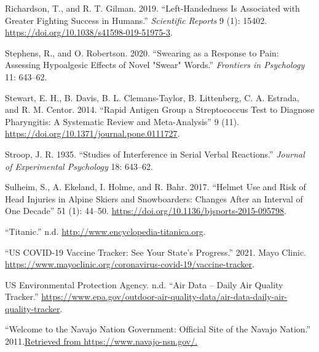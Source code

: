 \documentclass[
]{report}
\newlength{\cslhangindent}
\newlength{\cslentryspacingunit} %
\newenvironment{CSLReferences}[2] %
 {%
  \setlength{\parindent}{0pt}
  \ifodd #1
  \let\oldpar\par
  \def\par{\hangindent=\cslhangindent\oldpar}
  \fi
  \setlength{\parskip}{#2\cslentryspacingunit}
 }%
 {}
\begin{document}
\begin{CSLReferences}{1}{0}
\leavevmode{}%
Richardson, T., and R. T. Gilman. 2019. {``Left-Handedness Is Associated with Greater Fighting Success in Humans.''} \emph{Scientific Reports} 9 (1): 15402. \url{https://doi.org/10.1038/s41598-019-51975-3}.

\leavevmode{}%
Stephens, R., and O. Robertson. 2020. {``Swearing as a Response to Pain: Assessing Hypoalgesic Effects of Novel "Swear" Words.''} \emph{Frontiers in Psychology} 11: 643--62.

\leavevmode{}%
Stewart, E. H., B. Davis, B. L. Clemans-Taylor, B. Littenberg, C. A. Estrada, and R. M. Centor. 2014. {``Rapid Antigen Group a Streptococcus Test to Diagnose Pharyngitis: A Systematic Review and Meta-Analysis''} 9 (11). \url{https://doi.org/10.1371/journal.pone.0111727}.

\leavevmode{}%
Stroop, J. R. 1935. {``Studies of Interference in Serial Verbal Reactions.''} \emph{Journal of Experimental Psychology} 18: 643--62.

\leavevmode{}%
Sulheim, S., A. Ekeland, I. Holme, and R. Bahr. 2017. {``Helmet Use and Risk of Head Injuries in Alpine Skiers and Snowboarders: Changes After an Interval of One Decade''} 51 (1): 44--50. \url{https://doi.org/10.1136/bjsports-2015-095798}.

\leavevmode{}%
{``Titanic.''} n.d. \url{http://www.encyclopedia-titanica.org}.

\leavevmode{}%
{``US COVID-19 Vaccine Tracker: See Your State's Progress.''} 2021. Mayo Clinic. \url{https://www.mayoclinic.org/coronavirus-covid-19/vaccine-tracker}.

\leavevmode{}%
US Environmental Protection Agency. n.d. {``Air Data -- Daily Air Quality Tracker.''} \url{https://www.epa.gov/outdoor-air-quality-data/air-data-daily-air-quality-tracker}.

\leavevmode{}%
{``Welcome to the Navajo Nation Government: Official Site of the Navajo Nation.''} 2011.\href{\%20Retrieved\%20from\%20https://www.navajo-nsn.gov/.}{Retrieved from https://www.navajo-nsn.gov/.}

\end{CSLReferences}
\end{document}
